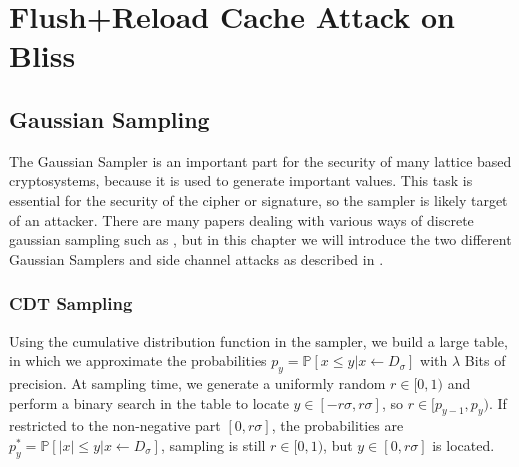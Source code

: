 %
%

\chapter{Flush+Reload Cache Attack on Bliss}
\label{bliss}

\section{Gaussian Sampling} %
The Gaussian Sampler is an important part for the security of many lattice based cryptosystems, because it is used to generate important values. This task is essential for the security of the cipher or signature, so the sampler is likely target of an attacker. There are many papers dealing with various ways of discrete gaussian sampling such as \cite{cryptoeprint:2010:088}, but in this chapter we will introduce the two different Gaussian Samplers and side channel attacks as described in \cite{cryptoeprint:2016:300}.
\subsection{CDT Sampling}
Using the cumulative distribution function in the sampler, we build a large table, in which we approximate the probabilities $p_y=\mathbb{P}[x \le y| x \leftarrow D_\sigma ]$ with $\lambda$ Bits of precision. At sampling time, we generate a uniformly random $r \in [0,1)$ and perform a binary search in the table to locate $y \in [-r\sigma, r\sigma]$, so $r \in [p_{y-1}, p_y)$. If restricted to the non-negative part $[0, r\sigma]$, the probabilities are $p^*_y = \mathbb{P}[|x| \le y| x \leftarrow D_\sigma]$, sampling is still $r \in [0,1)$, but $y \in [0, r \sigma]$ is located. 

